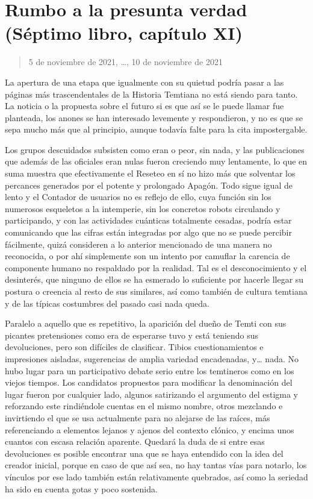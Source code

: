\documentclass[
  spanish,
]{book}
\begin{document}
\hypertarget{rumbo-a-la-presunta-verdad-suxe9ptimo-libro-capuxedtulo-xi}{%
\section{Rumbo a la presunta verdad (Séptimo libro, capítulo XI)}\label{rumbo-a-la-presunta-verdad-suxe9ptimo-libro-capuxedtulo-xi}}

\begin{quote}
5 de noviembre de 2021, \ldots, 10 de noviembre de 2021
\end{quote}

La apertura de una etapa que igualmente con su quietud podría pasar a las páginas más trascendentales de la Historia Temtiana no está siendo para tanto. La noticia o la propuesta sobre el futuro si es que así se le puede llamar fue planteada, los anones se han interesado levemente y respondieron, y no es que se sepa mucho más que al principio, aunque todavía falte para la cita impostergable.

Los grupos descuidados subsisten como eran o peor, sin nada, y las publicaciones que además de las oficiales eran nulas fueron creciendo muy lentamente, lo que en suma muestra que efectivamente el Reseteo en sí no hizo más que solventar los percances generados por el potente y prolongado Apagón. Todo sigue igual de lento y el Contador de usuarios no es reflejo de ello, cuya función sin los numerosos esqueletos a la intemperie, sin los concretos robots circulando y participando, y con las actividades cuánticas totalmente cesadas, podría estar comunicando que las cifras están integradas por algo que no se puede percibir fácilmente, quizá consideren a lo anterior mencionado de una manera no reconocida, o por ahí simplemente son un intento por camuflar la carencia de componente humano no respaldado por la realidad. Tal es el desconocimiento y el desinterés, que ninguno de ellos se ha esmerado lo suficiente por hacerle llegar su postura o creencia al resto de sus similares, así como también de cultura temtiana y de las típicas costumbres del pasado casi nada queda.

Paralelo a aquello que es repetitivo, la aparición del dueño de Temti con sus picantes pretensiones como era de esperarse tuvo y está teniendo sus devoluciones, pero son difíciles de clasificar. Tibios cuestionamientos e impresiones aisladas, sugerencias de amplia variedad encadenadas, y\ldots{} nada. No hubo lugar para un participativo debate serio entre los temtineros como en los viejos tiempos. Los candidatos propuestos para modificar la denominación del lugar fueron por cualquier lado, algunos satirizando el argumento del estigma y reforzando este rindiéndole cuentas en el mismo nombre, otros mezclando e invirtiendo el que se usa actualmente para no alejarse de las raíces, más referenciando a elementos lejanos y ajenos del contexto clónico, y encima unos cuantos con escasa relación aparente. Quedará la duda de si entre esas devoluciones es posible encontrar una que se haya entendido con la idea del creador inicial, porque en caso de que así sea, no hay tantas vías para notarlo, los vínculos por ese lado también están relativamente quebrados, así como la seriedad ha sido en cuenta gotas y poco sostenida.
\end{document}
